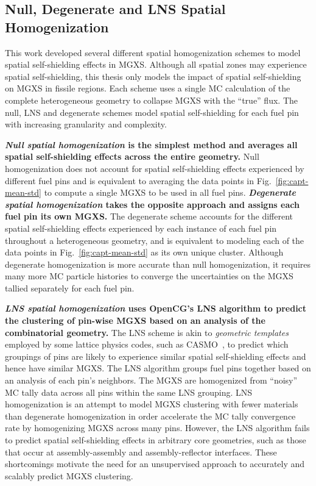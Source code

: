\documentclass[12pt,twoside]{mitthesis-exec}
\begin{document}
\subsection*{Null, Degenerate and LNS Spatial Homogenization}

This work developed several different spatial homogenization schemes to model spatial self-shielding effects in MGXS. Although all spatial zones may experience spatial self-shielding, this thesis only models the impact of spatial self-shielding on MGXS in fissile regions. Each scheme uses a single MC calculation of the complete heterogeneous geometry to collapse MGXS with the ``true'' flux. The null, LNS and degenerate schemes model spatial self-shielding for each fuel pin with increasing granularity and complexity.

\textbf{\textit{Null spatial homogenization} is the simplest method and averages all spatial self-shielding effects across the entire geometry.} Null homogenization does not account for spatial self-shielding effects experienced by different fuel pins and is equivalent to averaging the data points in Fig.~\ref{fig:capt-mean-std} to compute a single MGXS to be used in all fuel pins. \textbf{\textit{Degenerate spatial homogenization} takes the opposite approach and assigns each fuel pin its own MGXS.} The degenerate scheme accounts for the different spatial self-shielding effects experienced by each instance of each fuel pin throughout a heterogeneous geometry, and is equivalent to modeling each of the data points in Fig.~\ref{fig:capt-mean-std} as its own unique cluster. Although degenerate homogenization is more accurate than null homogenization, it requires many more MC particle histories to converge the uncertainties on the MGXS tallied separately for each fuel pin.

\textbf{\textit{LNS spatial homogenization} uses OpenCG's LNS algorithm to predict the clustering of pin-wise MGXS based on an analysis of the combinatorial geometry.} The LNS scheme is akin to \textit{geometric templates} employed by some lattice physics codes, such as CASMO~\cite{rhodes2006casmo}, to predict which groupings of pins are likely to experience similar spatial self-shielding effects and hence have similar MGXS. The LNS algorithm groups fuel pins together based on an analysis of each pin's neighbors. The MGXS are homogenized from ``noisy'' MC tally data across all pins within the same LNS grouping. LNS homogenization is an attempt to model MGXS clustering with fewer materials than degenerate homogenization in order accelerate the MC tally convergence rate by homogenizing MGXS across many pins. However, the LNS algorithm fails to predict spatial self-shielding effects in arbitrary core geometries, such as those that occur at assembly-assembly and assembly-reflector interfaces. These shortcomings motivate the need for an unsupervised approach to accurately and scalably predict MGXS clustering.
\end{document}
